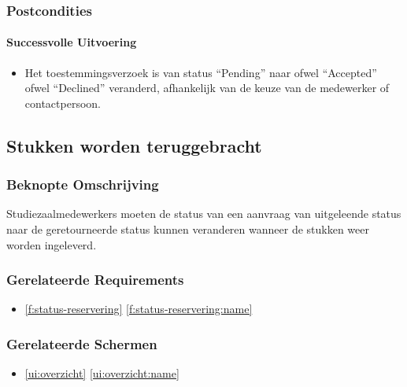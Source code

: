 \documentclass[a4paper,titlepage]{report}
\makeatletter
\def\namedlabel#1#2{
  \label{#1}
  \begingroup
   \def\@currentlabel{#2}%
   \label{#1:name}\endgroup
}
\def\namedref#1{\ref{#1} \ref{#1:name}}
\makeatother
\begin{document}
      \subsubsection{Postcondities}
        \paragraph{Successvolle Uitvoering}
        \begin{itemize}
          \item Het toestemmingsverzoek is van status ``Pending'' naar ofwel
          ``Accepted'' ofwel ``Declined'' veranderd, afhankelijk van de keuze
          van de medewerker of contactpersoon.
        \end{itemize}

    \pagebreak
    \subsection{Stukken worden teruggebracht}
    \namedlabel{u:retour}{Stuk wordt teruggebracht}
      \subsubsection{Beknopte Omschrijving}
        Studiezaalmedewerkers moeten de status van een aanvraag van
        uitgeleende status naar de geretourneerde status kunnen veranderen
        wanneer de stukken weer worden ingeleverd.
      \subsubsection{Gerelateerde Requirements}
        \begin{itemize}
          \item \namedref{f:status-reservering}
        \end{itemize}
      \subsubsection{Gerelateerde Schermen}
        \begin{itemize}
          \item \namedref{ui:overzicht}
        \end{itemize}
\end{document}
